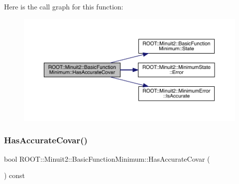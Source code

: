 Here is the call graph for this function\+:
\nopagebreak
\begin{figure}[H]
\begin{center}
\leavevmode
\includegraphics[width=350pt]{de/d25/classROOT_1_1Minuit2_1_1BasicFunctionMinimum_acc1e5d50ec4abe632af93c5dcebd9c0e_cgraph}
\end{center}
\end{figure}
\mbox{\label{classROOT_1_1Minuit2_1_1BasicFunctionMinimum_acc1e5d50ec4abe632af93c5dcebd9c0e}} 
\subsubsection{\texorpdfstring{HasAccurateCovar()}{HasAccurateCovar()}\hspace{0.1cm}{\footnotesize\ttfamily [2/3]}}
{\footnotesize\ttfamily bool R\+O\+O\+T\+::\+Minuit2\+::\+Basic\+Function\+Minimum\+::\+Has\+Accurate\+Covar (\begin{DoxyParamCaption}{ }\end{DoxyParamCaption}) const\hspace{0.3cm}{\ttfamily [inline]}}

